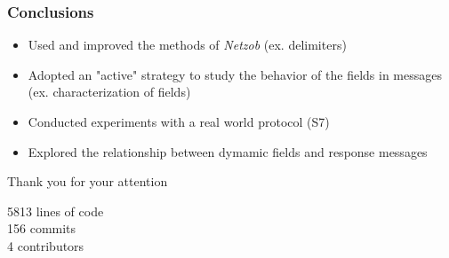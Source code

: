 \documentclass{beamer}
\newcounter{m} %
\newcounter{c} %
\begin{document}
\begin{frame}\frametitle{\bf Conclusions}
  \begin{itemize}
    \item Used and improved the methods of {\em Netzob} (ex. delimiters)
    \item Adopted an "active" strategy to study the behavior of the fields in messages (ex. characterization of fields)
    \item Conducted experiments with a real world protocol (S7)
    \item Explored the relationship between dymamic fields and response messages
  \end{itemize}
\end{frame}

\begin{frame}{Thank you for your attention}
  \begin{minipage}[t]{.5\textwidth}
    5813 lines of code\\156 commits\\4 contributors\\\vspace{3cm}
  \end{minipage}\begin{minipage}[t]{.5\textwidth}
    \centering

\end{minipage}
\end{frame}
\end{document}
